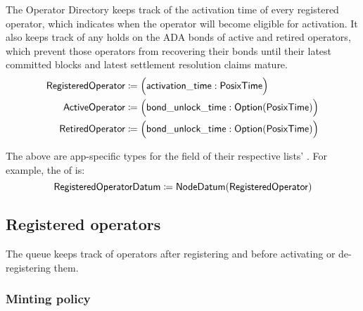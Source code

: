 \documentclass[../midgard.tex]{subfiles}
\begin{document}
The Operator Directory keeps track of the activation time of every registered operator, which indicates when the operator will become eligible for activation.
It also keeps track of any holds on the ADA bonds of active and retired operators, which prevent those operators from recovering their bonds until their latest committed blocks and latest settlement resolution claims mature.
\begin{align*}
    \mathsf{RegisteredOperator} &\coloneq \Bigl( \mathsf{activation\_time}: \mathsf{PosixTime} \Bigr) \\
    \mathsf{ActiveOperator}     &\coloneq \Bigl( \mathsf{bond\_unlock\_time}:
        \mathsf{Option}(\mathsf{PosixTime}) \Bigr) \\
    \mathsf{RetiredOperator}    &\coloneq \Bigl( \mathsf{bond\_unlock\_time}:
        \mathsf{Option}(\mathsf{PosixTime}) \Bigr)
\end{align*}

The above are app-specific types for the  field of their respective lists' .
For example, the  of  is:
\begin{equation*}
    \mathsf{RegisteredOperatorDatum} \coloneq \mathsf{NodeDatum} (\mathsf{RegisteredOperator})
\end{equation*}

\subsection{Registered operators}
\label{h:registered-operators}

The  queue keeps track of operators after registering and before activating or de-registering them.

\subsubsection{Minting policy}
\label{h:registered-operators-minting-policy}
\end{document}
